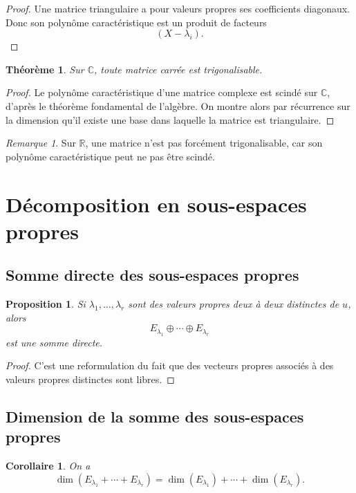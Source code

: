 \documentclass[11pt,a4paper]{article}
\newtheorem{theoreme}[definition]{Théorème}
\newtheorem{proposition}[definition]{Proposition}
\newtheorem{corollaire}[definition]{Corollaire}
\theoremstyle{remark}
\newtheorem{remarque}[definition]{Remarque}
\newcommand{\R}{\mathbb{R}}
\newcommand{\C}{\mathbb{C}}
\begin{document}
\begin{proof}
Une matrice triangulaire a pour valeurs propres ses coefficients diagonaux. Donc son polynôme caractéristique est un produit de facteurs
\[
(X-\lambda_i).
\]
\end{proof}

\begin{theoreme}
Sur \(\C\), toute matrice carrée est trigonalisable.
\end{theoreme}

\begin{proof}
Le polynôme caractéristique d’une matrice complexe est scindé sur \(\C\), d’après le théorème fondamental de l’algèbre. On montre alors par récurrence sur la dimension qu’il existe une base dans laquelle la matrice est triangulaire.
\end{proof}

\begin{remarque}
Sur \(\R\), une matrice n’est pas forcément trigonalisable, car son polynôme caractéristique peut ne pas être scindé.
\end{remarque}

\section{Décomposition en sous-espaces propres}

\subsection{Somme directe des sous-espaces propres}

\begin{proposition}
Si \(\lambda_1,\dots,\lambda_r\) sont des valeurs propres deux à deux distinctes de \(u\), alors
\[
E_{\lambda_1}\oplus\cdots\oplus E_{\lambda_r}
\]
est une somme directe.
\end{proposition}

\begin{proof}
C’est une reformulation du fait que des vecteurs propres associés à des valeurs propres distinctes sont libres.
\end{proof}

\subsection{Dimension de la somme des sous-espaces propres}

\begin{corollaire}
On a
\[
\dim(E_{\lambda_1}+\cdots+E_{\lambda_r})
=
\dim(E_{\lambda_1})+\cdots+\dim(E_{\lambda_r}).
\]
\end{corollaire}
\end{document}
